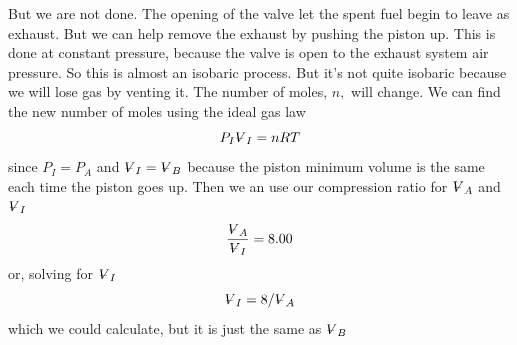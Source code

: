 \documentclass{article}
\begin{document}
But we are not done. The opening of the valve let the spent fuel begin to
leave as exhaust. But we can help remove the exhaust by pushing the piston
up. This is done at constant pressure, because the valve is open to the
exhaust system air pressure. So this is almost an isobaric process. But it's
not quite isobaric because we will lose gas by venting it. The number of
moles, $n,$ will change. We can find the new number of moles using the ideal
gas law%
\[
P_{I}%
\ooalign{\hfil$V$\hfil\cr\kern0.1em--\hfil\cr}%
_{I}=nRT 
\]%
since $P_{I}=P_{A}$ and $%
\ooalign{\hfil$V$\hfil\cr\kern0.1em--\hfil\cr}%
_{I}=%
\ooalign{\hfil$V$\hfil\cr\kern0.1em--\hfil\cr}%
_{B}$ because the piston minimum volume is the same each time the piston
goes up. Then we an use our compression ratio for $%
\ooalign{\hfil$V$\hfil\cr\kern0.1em--\hfil\cr}%
_{A}$ and $%
\ooalign{\hfil$V$\hfil\cr\kern0.1em--\hfil\cr}%
_{I}$%
\[
\frac{%
\ooalign{\hfil$V$\hfil\cr\kern0.1em--\hfil\cr}%
_{A}}{%
\ooalign{\hfil$V$\hfil\cr\kern0.1em--\hfil\cr}%
_{I}}=8.00 
\]%
or, solving for $%
\ooalign{\hfil$V$\hfil\cr\kern0.1em--\hfil\cr}%
_{I}$ 
\[
\ooalign{\hfil$V$\hfil\cr\kern0.1em--\hfil\cr}%
_{I}=8/%
\ooalign{\hfil$V$\hfil\cr\kern0.1em--\hfil\cr}%
_{A} 
\]%
which we could calculate, but it is just the same as $%
\ooalign{\hfil$V$\hfil\cr\kern0.1em--\hfil\cr}%
_{B}$
\end{document}
